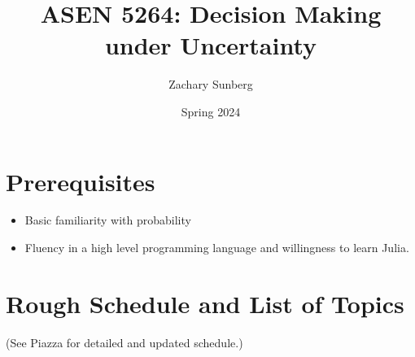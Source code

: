 \documentclass[9pt]{article}
\title{ASEN 5264: Decision Making under Uncertainty}
\author{Zachary Sunberg}
\date{Spring 2024}
\begin{document}
\maketitle

\section*{Prerequisites}

\begin{itemize}[nosep]
    \item Basic familiarity with probability
    \item Fluency in a high level programming language and willingness to learn Julia.
\end{itemize}

\section*{Rough Schedule and List of Topics}

(See Piazza for detailed and updated schedule.)
\end{document}
